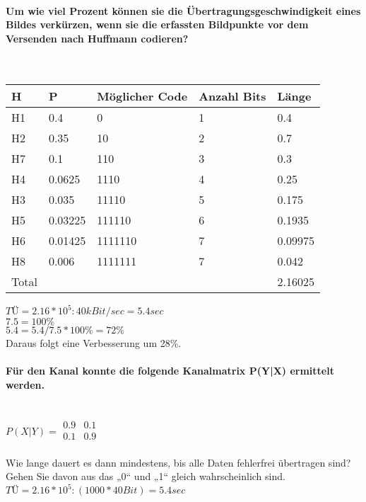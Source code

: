\paragraph{Um wie viel Prozent können sie die Übertragungsgeschwindigkeit eines Bildes verkürzen, wenn sie die erfassten Bildpunkte vor dem Versenden nach Huffmann codieren?}\mbox{}\\
\begin{center}
    \centering
    \begin{tabular}{p{1cm} | p{1cm} | p{1cm} | p{1cm} | p{1cm}}
        \bfseries{H} & \bfseries{P} & \bfseries{Möglicher Code} & \bfseries{Anzahl Bits} & \bfseries{Länge}\\ \hline
        H1 & 0.4 & 0 & 1 & 0.4\\ 
        H2 & 0.35 & 10 & 2 & 0.7\\
        H7 & 0.1 & 110 & 3 & 0.3\\
        H4 & 0.0625 & 1110 & 4 & 0.25\\
        H3 & 0.035 & 11110 & 5 & 0.175\\
        H5 & 0.03225 & 111110 & 6 & 0.1935\\
        H6 & 0.01425 & 1111110 & 7 & 0.09975\\
        H8 & 0.006 & 1111111 & 7 & 0.042\\
        Total & & & & 2.16025
    \end{tabular}
\end{center}

$TÜ=2.16*10^5:40kBit/sec = 5.4sec$\\
$7.5=100\%$\\
$5.4 = 5.4/7.5*100\% = 72\%$\\
Daraus folgt eine Verbesserung um 28\%.

\paragraph{Für den Kanal konnte die folgende Kanalmatrix P(Y|X) ermittelt werden.}\mbox{}\\
$P(X|Y) = \begin{matrix}
    0.9 & 0.1\\
    0.1 & 0.9\\
\end{matrix}$

Wie lange dauert es dann mindestens, bis alle Daten fehlerfrei übertragen sind? Gehen Sie davon aus das „0“ und  „1“ gleich wahrscheinlich sind. \\
$TÜ = 2.16*10^5:(1000*40Bit)=5.4sec$

